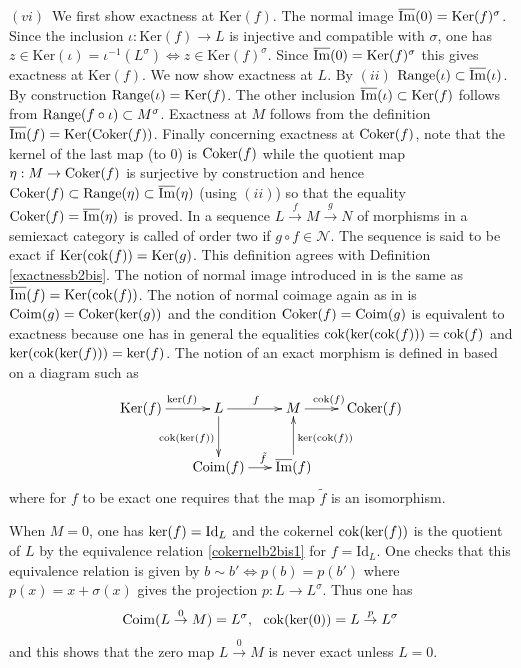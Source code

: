 \documentclass[12pt]{article}
\def\Coker{{\rm Coker}}
\def\id{{\rm id}}
\def\Ker{{\rm Ker}}
\def\sker{{\rm ker}}
\def\coker{{\rm Coker}}
\def\scoker{{\rm cok}}
\def\imm{\overline{\rm Im}}
\def\coimm{{\rm Coim}}
\def\cN{{\mathcal N}}
\def\id{{\mbox{Id}}}
\def\ker{{\mbox{Ker}}}
\begin{document}
   $(vi)$~We first show exactness at $\ker(f)$. The normal image $\imm(0)=\ker(f)^\sigma$. Since the inclusion $\iota:\ker(f)\to L$ is injective and compatible with $\sigma$, one has 
 $
 z\in \ker(\iota)=\iota^{-1}(L^\sigma)\Leftrightarrow z\in \ker(f)^\sigma
 $.
 Since $\imm(0)=\ker(f)^\sigma$ this gives exactness at $\ker(f)$. We now show exactness at $L$. By $(ii)$ ${\rm Range}(\iota)\subset \imm(\iota)$. By construction ${\rm Range}(\iota)=\ker(f)$. The other inclusion $\imm(\iota)\subset \ker(f)$ follows from ${\rm Range}(f\circ \iota)\subset M^\sigma$. Exactness at $M$ follows from the definition $\imm(f)=\ker(\coker(f))$. Finally concerning exactness at $\coker(f)$, note that the kernel of the last map (to $0$) is
 $\coker(f)$ while the quotient map $\eta:M\to\coker(f)$ is surjective by construction and hence $\coker(f)\subset {\rm Range}(\eta)\subset \imm(\eta)$  (using $(ii)$) so that 
 the equality $\coker(f)=\imm(\eta)$ is proved. 
\endproof 
  In \cite{gra} a sequence $L\stackrel{f}{\to}M\stackrel{g}{\to}N$ of morphisms in a semiexact category is called of order two if $g\circ f\in \cN$. The sequence is said to be exact if $\Ker(\scoker(f))=\Ker(g)$. This definition agrees with Definition \ref{exactnessb2bis}. The notion of normal image introduced in \cite{gra} is the same as $\imm(f)=\Ker(\scoker(f))$. The notion of normal coimage again as in \cite{gra} is $\coimm(g)=\Coker(\sker(g))$ and the condition $\coker(f)=\coimm(g)$ is equivalent to exactness because one has in general the equalities $\scoker(\sker(\scoker(f)))=\scoker(f)$ and $\sker(\scoker(\sker(f)))=\sker(f)$. The notion of an exact morphism is defined in \cite{gra}  based on a diagram such as
  \begin{equation}\label{canonical factorization}
\xymatrix@C=5pt@R=25pt{
\ker(f) \ar[rr]^{\ \sker(f)}  &&
L \ar[d]_{\scoker(\sker(f))}\ar[rr]^{f} && M\ar[rr]^{\!\!\!\!\scoker(f)}&&\, \, \coker(f)
\\
&&\coimm(f) \ar[rr]^{\ \ \ \tilde f}&& \imm(f)\ar[u]_{\sker(\scoker(f))}}
\end{equation}
  where for $f$ to be exact one requires that the map $\tilde f$ is an isomorphism. 
  
  When $M=0$, one has $\sker(f)=\id_L$ and the cokernel $\scoker(\sker(f))$ is the quotient of $L$ by the equivalence relation \eqref{cokernelb2bis1} for $f=\id_L$. One checks that this equivalence relation is given by $b\sim b'\iff p(b)=p(b')$ where $p(x)=x+\sigma(x)$ gives the projection  $p: L\to L^\sigma$. Thus one has 
   \begin{equation}\label{coimagezero}
 \coimm(L\stackrel{0}{\to}M)=L^\sigma, \  \ \scoker(\sker(0))=L\stackrel{p}{\to}L^\sigma
\end{equation}
and this shows that the zero map $L\stackrel{0}{\to}M$ is never exact unless $L=0$. \vspace{.05in}
\end{document}
